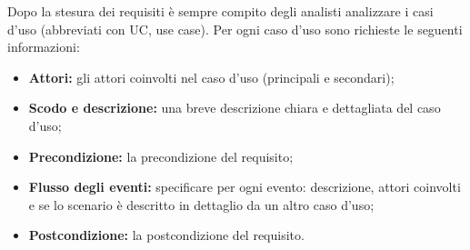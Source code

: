 Dopo la stesura dei requisiti è sempre compito degli analisti analizzare i casi d'uso (abbreviati con UC, use case).
Per ogni caso d'uso sono richieste le seguenti informazioni:
\begin{itemize}
	\item \textbf{Attori:} gli attori coinvolti nel caso d'uso (principali e secondari);
	\item \textbf{Scodo e descrizione:} una breve descrizione chiara e dettagliata del caso d'uso;
	\item \textbf{Precondizione:} la precondizione del requisito;
	\item \textbf{Flusso degli eventi:} specificare per ogni evento: descrizione, attori coinvolti e se lo scenario è descritto in dettaglio da un altro caso d'uso;
	\item \textbf{Postcondizione:} la postcondizione del requisito.
\end{itemize}
\newpage
